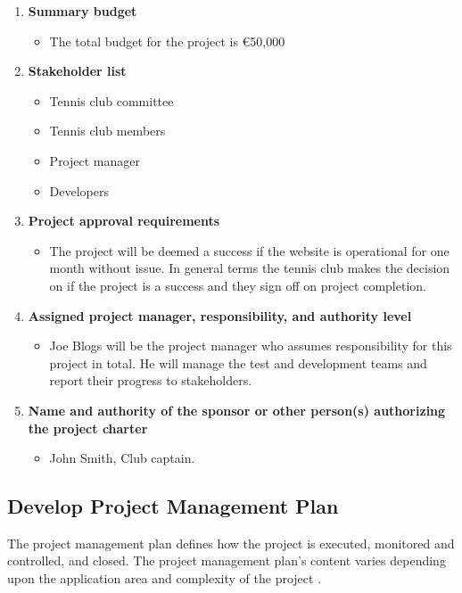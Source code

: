 \begin{enumerate}
\item \textbf{Summary budget}
\begin{itemize}
\item The total budget for the project is €50,000
\end{itemize}

\item \textbf{Stakeholder list}
\begin{itemize}
\item Tennis club committee
\item Tennis club members
\item Project manager
\item Developers
\end{itemize}

\item \textbf{Project approval requirements}
\begin{itemize}
\item The project will be deemed a success if the website is operational for one month without issue. In general terms the tennis club makes the decision on if the project is a success and they sign off on project completion.
\end{itemize}

\item \textbf{Assigned project manager, responsibility, and authority level}
\begin{itemize}
\item Joe Blogs will be the project manager who assumes responsibility for this project in total. He will manage the test and development teams and report their progress to stakeholders.
\end{itemize}
\item \textbf{Name and authority of the sponsor or other person(s) authorizing the project charter}
\begin{itemize}
\item John Smith, Club captain.
\end{itemize}
\end{enumerate}

\subsection{Develop Project Management Plan}

The project management plan defines how the project is executed, monitored and controlled, and closed. The project management plan’s content varies depending upon the application area and complexity of the project \parencite{pmbok}.

